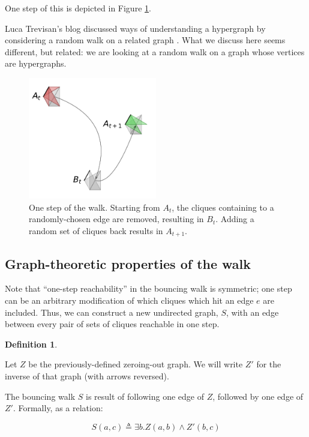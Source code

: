 \documentclass[12pt]{article}
\theoremstyle{definition}
\newtheorem{defn}{Definition}[section]
\begin{document}
One step of this is depicted in Figure \ref{fig:boing}.

Luca Trevisan's blog discussed ways of understanding a hypergraph by
considering a random walk on a related graph
\cite{luca_trevisan_blog_random_walks_1}.
What we discuss here seems different, but related:
we are looking at a random walk on a graph whose vertices are
hypergraphs.

\begin{figure}

\centering

\includegraphics[width=0.5\textwidth]{bounce.pdf}

\caption{
One step of the walk. Starting from $A_t$, the cliques containing 
to a randomly-chosen edge are removed, resulting in $B_t$.
Adding a random set of cliques back results in $A_{t+1}$.
}
\label{fig:boing}

\end{figure}

\subsection{Graph-theoretic properties of the walk}

Note that ``one-step reachability'' in the bouncing walk is symmetric;
one step can be an arbitrary modification of which cliques which hit
an edge $e$ are included.
Thus, we can construct a new undirected graph, $S$, with an edge between every
pair of sets of cliques reachable in one step.

\begin{defn} \label{def:bouncingWalk}

Let $Z$ be the previously-defined zeroing-out graph. We will write $Z'$ for
the inverse of that graph (with arrows reversed).

The bouncing walk $S$ is result of following one edge of $Z$, followed by one
edge of $Z'$. Formally, as a relation:

\[
S(a,c) \triangleq \exists b. Z(a,b) \land Z'(b,c)
\]

\end{defn}
\end{document}

